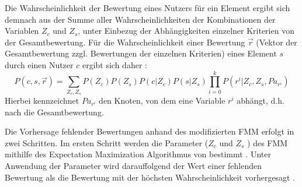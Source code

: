 Die Wahrscheinlichkeit der Bewertung eines Nutzers für ein Element ergibt sich demnach aus der Summe aller Wahrscheinlichkeiten der Kombinationen der Variablen $Z_{c}$ und $Z_{s}$, unter Einbezug der Abhängigkeiten einzelner Kriterien von der Gesamtbewertung.
Für die Wahrscheinlichkeit einer Bewertung $\vec{r}$ (Vektor der Gesamtbewertung zzgl. Bewertungen der einzelnen Kriterien) eines Element $s$ durch einen Nutzer $c$ ergibt sich daher \cite[S. 244]{sahoo:article}:
\begin{equation}\label{eq26}
    P(c,s,\vec{r}) = \sum\limits_{Z_{c}, Z_{s}}P(Z_{c})P(Z_{s})P(c|Z_{c})P(s|Z_{s})\prod\limits_{i=0}^{k} P(r^{i}|Z_{c},Z_{s}, Pa_{r^{i}})
\end{equation}
Hierbei kennzeichnet $Pa_{r^{i}}$ den Knoten, von dem eine Variable $r^{i}$ abhängt, d.h. nach \textcite[S. 236]{sahoo:article} die Gesamtbewertung.

Die Vorhersage fehlender Bewertungen anhand des modifizierten \ac{FMM} erfolgt in zwei Schritten. 
Im ersten Schritt werden die Parameter ($Z_{c}$ und $Z_{s}$ \cite[S. 4]{si:inproceedings}) des \ac{FMM} mithilfe des Expectation Maximization Algorithmus von \textcite[S. 1ff.]{dempster:article} bestimmt \cite[S. 863]{adomavicius:4:inbook}.
Unter Anwendung der Parameter wird darauffolgend der Wert einer fehlenden Bewertung als die Bewertung mit der höchsten Wahrscheinlichkeit vorhergesagt \cite[S. 863]{adomavicius:4:inbook}. 



